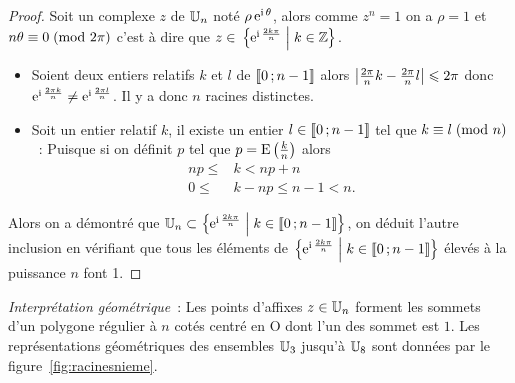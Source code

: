 \begin{proof}
  Soit un complexe \(z\) de \(\mathbb{U}_n\) noté \(\rho \operatorname{e}^{\operatorname{i} \theta}\), alors comme
  \(z^n = 1\) on a \(\rho = 1\) et \(n\theta \equiv 0\!\pmod {2\pi}\) c'est à dire
  que \(z \in{}\left\{\operatorname{e}^{\operatorname{i} \frac{2k\pi}{n}}\mathrel{}\middle|\mathrel{}k \in{}\mathbb{Z}\right\}\).
  \begin{itemize}
    \item Soient deux entiers relatifs \(k\) et \(l\) de
      \(\mathopen{\llbracket}0\mathclose{}\mathpunct{};n-1\mathclose{\rrbracket}\) alors \(\left\lvert\frac{2\pi}{n}k -
      \frac{2\pi}{n}l\right\rvert \leqslant 2\pi\) donc \(\operatorname{e}^{\operatorname{i} \frac{2\pi k}{n}}
      \neq \operatorname{e}^{\operatorname{i} \frac{2\pi l}{n}}\). Il y a donc \(n\) racines
      distinctes.
    \item Soit un entier relatif \(k\), il existe un entier \(l \in{}
      \mathopen{\llbracket}0\mathclose{}\mathpunct{};n-1\mathclose{\rrbracket}\) tel que \(k \equiv l\!\pmod {n}\)~:
      Puisque si on définit \(p\) tel que \(p = \operatorname{E}\left( \frac{k}{n}
      \right)\) alors
      \begin{align*}
        np \leqslant & k < np  + n \\
        0 \leqslant & k-np \leqslant n-1 <n.
      \end{align*}
  \end{itemize}
  Alors on a démontré que \(\mathbb{U}_n \subset \left\{\operatorname{e}^{\operatorname{i} \frac{2k\pi}{n}}\mathrel{}\middle|\mathrel{}k
  \in{}\mathopen{\llbracket}0\mathclose{}\mathpunct{};n-1\mathclose{\rrbracket}\right\}\), on déduit l'autre inclusion en vérifiant
  que tous les éléments de \(\left\{\operatorname{e}^{\operatorname{i} \frac{2k\pi}{n}}\mathrel{}\middle|\mathrel{}k \in{}
  \mathopen{\llbracket}0\mathclose{}\mathpunct{};n - 1\mathclose{\rrbracket}\right\}\) élevés à la puissance \(n\) font 1.
\end{proof}

\emph{Interprétation géométrique}~: Les points d'affixes \(z \in{}\mathbb{U}_n\) forment
les sommets d'un polygone régulier à \(n\) cotés centré en O dont l'un des
sommet est \(1\). Les représentations géométriques des ensembles \(\mathbb{U}_3\)
jusqu'à \(\mathbb{U}_{8}\) sont données par le figure~\ref{fig:racinesnieme}.

